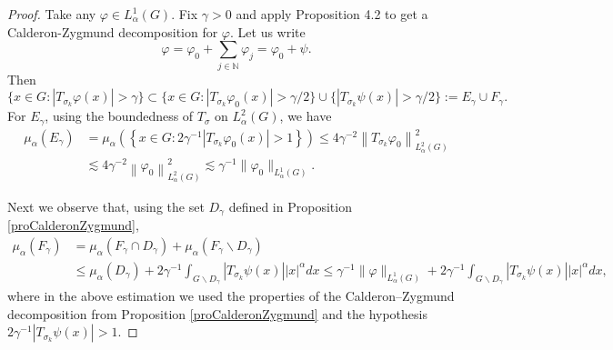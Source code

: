 \documentclass[12pt, reqno]{amsart}
\newcommand{\1}{\mathds{1}}
\begin{document}
\begin{proof}
Take any $\varphi \in L_{\alpha}^{1}(G)$. Fix $\gamma>0$ and apply Proposition 4.2 to get a Calderon-Zygmund decomposition for $\varphi$. Let us write
\[
\varphi=\varphi_{0}+\sum_{j \in \mathbb{N}} \varphi_{j}=\varphi_{0}+\psi.
\]
Then
\[
\{x \in G:|T_{\sigma_{k}} \varphi(x)|>\gamma\} \subset\{x \in G:|T_{\sigma_{k}} \varphi_{0}(x)|>\gamma / 2\} \cup\{|T_{\sigma_{k}} \psi(x)|>\gamma / 2\}:=E_{\gamma} \cup F_{\gamma}.
\]
For $E_{\gamma}$, using the boundedness of $T_\sigma$ on $L^2_\alpha (G)$, we have
\begin{align*}
\mu_{\alpha}\left(E_{\gamma}\right)&=\mu_{\alpha}\left(\left\{x \in G:2 \gamma^{-1}\left|T_{\sigma_{k}} \varphi_{0}(x)\right|>1\right\}\right)
\leq 4 \gamma^{-2}\left\|T_{\sigma_{k}} \varphi_{0}\right\|_{L_{\alpha}^{2}(G)}^{2} \\ & \lesssim 4 \gamma^{-2}\left\|\varphi_{0}\right\|_{L_{\alpha}^{2}(G)}^{2} \lesssim \gamma^{-1}\|\varphi_{0}\|_{L_{\alpha}^{1}(G)}.
\end{align*}

Next we observe that, using the set $D_\gamma$ defined in Proposition \ref{proCalderonZygmund},
\begin{align*}
\mu_{\alpha}\left(F_{\gamma}\right)&=\mu_{\alpha}\left(F_{\gamma} \cap D_{\gamma}\right)+\mu_{\alpha}\left(F_{\gamma} \backslash D_{\gamma}\right)
\\ &\leq \mu_{\alpha}\left(D_{\gamma}\right)+2 \gamma^{-1} \int_{G \backslash D_{\gamma}}\left|T_{\sigma_{k}} \psi(x)\right| |x|^{\alpha} d x
\leq \gamma^{-1}\|\varphi\|_{L_{\alpha}^{1}(G)}+2 \gamma^{-1} \int_{G \backslash D_{\gamma}}\left|T_{\sigma_{k}} \psi(x)\right||x|^{\alpha} d x,
\end{align*}
where in the above estimation we used the properties of the Calderon--Zygmund decomposition from Proposition \ref{proCalderonZygmund} and the hypothesis $2 \gamma^{-1} \left|T_{\sigma_{k}} \psi(x)\right|>1$.


\end{proof}
\end{document}
